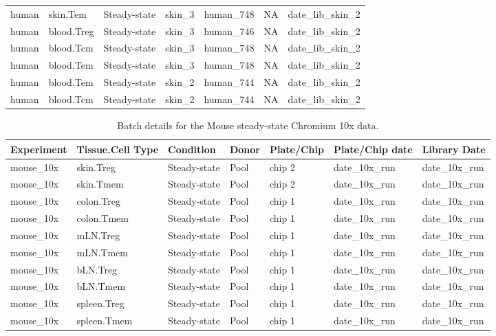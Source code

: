 \begin{table}[ht!]
\begin{tabular}{lllllll}
  human & skin.Tem & Steady-state & skin\_3 & human\_748 & NA & date\_lib\_skin\_2 \\ 
  human & blood.Treg & Steady-state & skin\_3 & human\_746 & NA & date\_lib\_skin\_2 \\ 
  human & blood.Tcm & Steady-state & skin\_3 & human\_748 & NA & date\_lib\_skin\_2 \\ 
  human & blood.Tem & Steady-state & skin\_3 & human\_748 & NA & date\_lib\_skin\_2 \\ 
  human & blood.Tem & Steady-state & skin\_2 & human\_744 & NA & date\_lib\_skin\_2 \\ 
  human & blood.Tcm & Steady-state & skin\_2 & human\_744 & NA & date\_lib\_skin\_2 \\ 
   \bottomrule
\end{tabular}
\end{table}

\begin{table}[ht!]
\scriptsize
\caption[Batch details for the Mouse steady-state Chromium 10x data]{Batch details for the Mouse steady-state Chromium 10x data.}
\centering
\label{table:tab_A_batch_10x}
\begin{tabular}{lllllll}
  \toprule
Experiment & Tissue.Cell Type & Condition & Donor & Plate/Chip & Plate/Chip date & Library Date \\ 
  \midrule
  mouse\_10x & skin.Treg & Steady-state & Pool & chip 2 & date\_10x\_run & date\_10x\_run \\ 
  mouse\_10x & skin.Tmem & Steady-state & Pool & chip 2 & date\_10x\_run & date\_10x\_run \\ 
  mouse\_10x & colon.Treg & Steady-state & Pool & chip 1 & date\_10x\_run & date\_10x\_run \\ 
  mouse\_10x & colon.Tmem & Steady-state & Pool & chip 1 & date\_10x\_run & date\_10x\_run \\ 
  mouse\_10x & mLN.Treg & Steady-state & Pool & chip 1 & date\_10x\_run & date\_10x\_run \\ 
  mouse\_10x & mLN.Tmem & Steady-state & Pool & chip 1 & date\_10x\_run & date\_10x\_run \\ 
  mouse\_10x & bLN.Treg & Steady-state & Pool & chip 1 & date\_10x\_run & date\_10x\_run \\ 
  mouse\_10x & bLN.Tmem & Steady-state & Pool & chip 1 & date\_10x\_run & date\_10x\_run \\ 
  mouse\_10x & spleen.Treg & Steady-state & Pool & chip 1 & date\_10x\_run & date\_10x\_run \\ 
  mouse\_10x & spleen.Tmem & Steady-state & Pool & chip 1 & date\_10x\_run & date\_10x\_run \\ 
   \bottomrule
\end{tabular}
\end{table}

